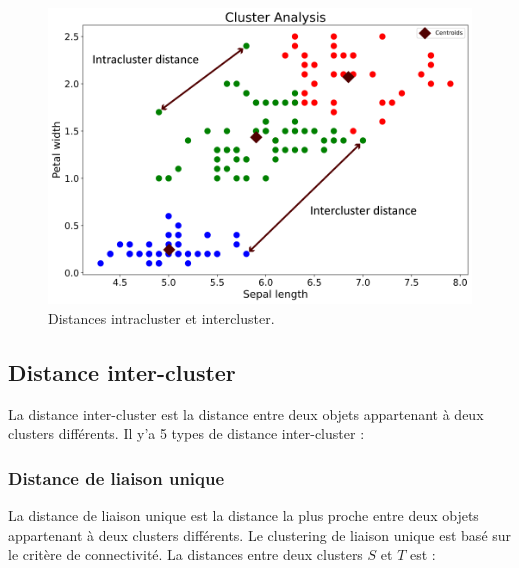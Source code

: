 \begin{figure}[H]
	\begin{center}
		\includegraphics[width=\textwidth]{images/chapitre6/iris_inter_intra_clusters.png}
	\end{center}
\caption{Distances intracluster et intercluster.}
\label{inter_intra_clusters}
\end{figure}

\subsection{Distance inter-cluster}
La distance inter-cluster est la distance entre deux objets appartenant à deux clusters différents. Il y’a 5 types de distance inter-cluster :

\subsubsection{Distance de liaison unique}
La distance de liaison unique est la distance la plus proche entre deux objets appartenant à deux clusters différents. Le clustering de liaison unique est basé sur le critère de connectivité. La distances entre deux clusters \(\displaystyle S \) et \(\displaystyle T \) est : \cite{maulik2002performance}


